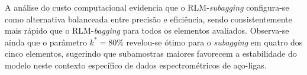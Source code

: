 A análise do custo computacional evidencia que o 
RLM-\textit{subagging} configura-se como alternativa balanceada entre 
precisão e eficiência, sendo consistentemente mais rápido que o 
RLM-\textit{bagging} para todos os elementos avaliados. Observa-se 
ainda que o parâmetro $k^* = 80\%$ revelou-se ótimo para o 
\textit{subagging} em quatro dos cinco elementos, sugerindo que 
subamostras maiores favorecem a estabilidade do modelo neste 
contexto específico de dados espectrométricos de aço-ligas.

%
%
%

